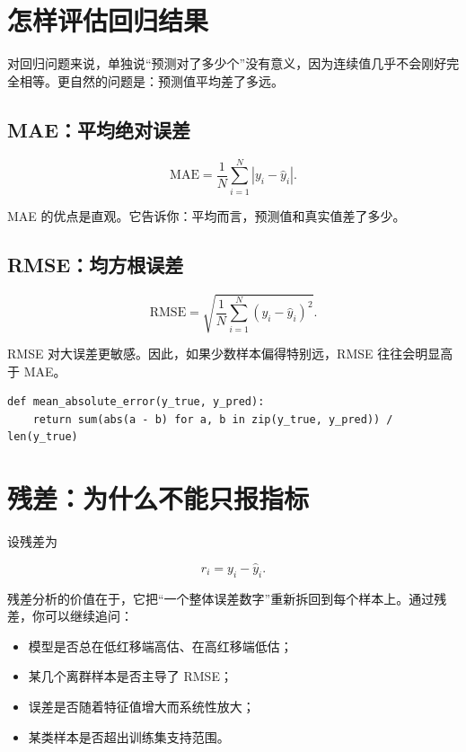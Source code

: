 \section{怎样评估回归结果}

对回归问题来说，单独说“预测对了多少个”没有意义，因为连续值几乎不会刚好完全相等。更自然的问题是：预测值平均差了多远。

\subsection{MAE：平均绝对误差}

\[
\mathrm{MAE} =
\frac{1}{N}\sum_{i=1}^{N}
\left|y_i - \hat{y}_i\right|.
\]

MAE 的优点是直观。它告诉你：平均而言，预测值和真实值差了多少。

\subsection{RMSE：均方根误差}

\[
\mathrm{RMSE} =
\sqrt{
\frac{1}{N}\sum_{i=1}^{N}
\left(y_i - \hat{y}_i\right)^2
}.
\]

RMSE 对大误差更敏感。因此，如果少数样本偏得特别远，RMSE 往往会明显高于 MAE。

\begin{examplebox}
\begin{lstlisting}[style=pythonstyle]
def mean_absolute_error(y_true, y_pred):
    return sum(abs(a - b) for a, b in zip(y_true, y_pred)) / len(y_true)
\end{lstlisting}
\end{examplebox}

\section{残差：为什么不能只报指标}

设残差为

\[
r_i = y_i - \hat{y}_i.
\]

残差分析的价值在于，它把“一个整体误差数字”重新拆回到每个样本上。通过残差，你可以继续追问：

\begin{itemize}
    \item 模型是否总在低红移端高估、在高红移端低估；
    \item 某几个离群样本是否主导了 RMSE；
    \item 误差是否随着特征值增大而系统性放大；
    \item 某类样本是否超出训练集支持范围。
\end{itemize}

